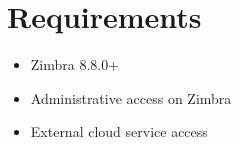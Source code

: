 \section{Requirements}
    \begin{itemize}
        \item Zimbra 8.8.0+
        \item Administrative access on Zimbra
        \item External cloud service access
    \end{itemize}